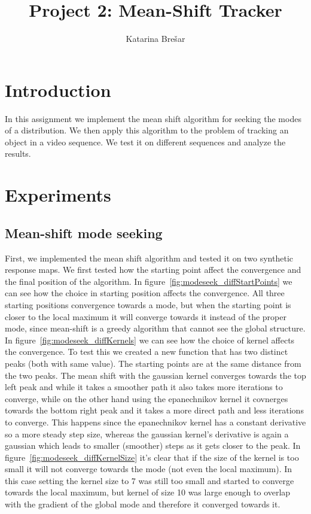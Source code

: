 \documentclass[9pt]{IEEEtran}
\title{\vspace{0ex}
Project 2: Mean-Shift Tracker}
\author{Katarina Brešar\vspace{-4.0ex}}
\begin{document}
\maketitle

\section{Introduction}
In this assignment we implement the mean shift algorithm for seeking the modes of a distribution. We then 
apply this algorithm to the problem of tracking an object in a video sequence. We test it on different
sequences and analyze the results.

\section{Experiments}
\subsection{Mean-shift mode seeking}
First, we implemented the mean shift algorithm and tested it on two synthetic response maps. We first tested how the
starting point affect the convergence and the final position of the algorithm. In figure~\ref{fig:modeseek_diffStartPoints} we
can see how the choice in starting position affects the convergence. All three starting positions convergence towards a mode, but
when the starting point is closer to the local maximum it will converge towards it instead of the proper mode, since mean-shift is a greedy
algorithm that cannot see the global structure.  
In figure~\ref{fig:modeseek_diffKernels} we can see how the choice of kernel affects the convergence. To test this we created a new function
that has two distinct peaks (both with same value). The starting points are at the same distance from the two peaks. 
The mean shift with the gaussian kernel converges towards the top left peak and while it takes a smoother path
it also takes more iterations to converge, while on the other hand using the epanechnikov kernel it covnerges towards the
bottom right peak and it takes a more direct path and less iterations to converge. This happens since the epanechnikov kernel has a constant
derivative so a more steady step size, whereas the gaussian kernel's derivative is again a gaussian which leads to smaller (smoother) steps
as it gets closer to the peak.
In figure~\ref{fig:modeseek_diffKernelSize} it's clear that if the size of the kernel is too small it will not converge towards the mode 
(not even the local maximum). In this case setting the kernel size to 7 was still too small and started to converge towards the local 
maximum, but kernel of size 10 was large enough to overlap with the gradient of the global mode and therefore it converged towards it.
\end{document}
